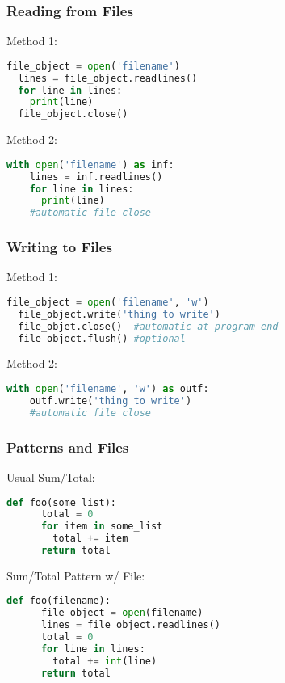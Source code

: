 \documentclass{beamer}
\begin{document}
%
%
\begin{frame}[fragile]
  \frametitle{Reading from Files}
  Method 1:
  \begin{lstlisting}[language=Python, autogobble]
  file_object = open('filename')
  lines = file_object.readlines()
  for line in lines:
    print(line)
  file_object.close()
  \end{lstlisting}
  \vfill
  Method 2:
  \begin{lstlisting}[language=Python, autogobble]
  with open('filename') as inf:
    lines = inf.readlines()
    for line in lines:
      print(line)
    #automatic file close
  \end{lstlisting}
\end{frame}

%
%
\begin{frame}[fragile]
  \frametitle{Writing to Files}
  Method 1:
  \begin{lstlisting}[language=Python, autogobble]
  file_object = open('filename', 'w')
  file_object.write('thing to write')
  file_objet.close()  #automatic at program end
  file_object.flush() #optional
  \end{lstlisting}
  \vfill
  Method 2:
  \begin{lstlisting}[language=Python, autogobble]
  with open('filename', 'w') as outf:
    outf.write('thing to write')
    #automatic file close
  \end{lstlisting}
\end{frame}

%
%
\begin{frame}[fragile]
  \frametitle{Patterns and Files}
  \begin{minipage}{0.38\textwidth}
    Usual Sum/Total:
    \begin{lstlisting}[language=Python, autogobble]
    def foo(some_list):
      total = 0
      for item in some_list
        total += item
      return total
    \end{lstlisting}
  \end{minipage}
  \hfill
  \begin{minipage}{0.58\textwidth}
    Sum/Total Pattern w/ File:
    \begin{lstlisting}[language=Python, autogobble]
    def foo(filename):
      file_object = open(filename)
      lines = file_object.readlines()
      total = 0
      for line in lines:
        total += int(line)
      return total
    \end{lstlisting}
  \end{minipage}
\end{frame}
\end{document}
